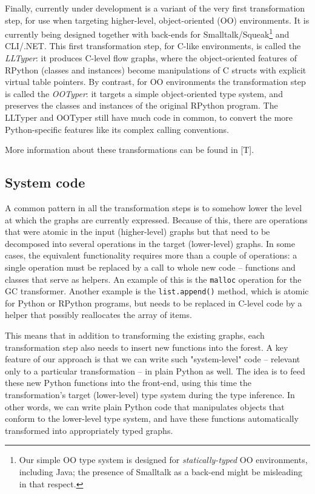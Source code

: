 \documentclass{acm_proc_article-sp}
\begin{document}
Finally, currently under development is a variant of the very first
transformation step, for use when targeting higher-level,
object-oriented (OO) environments.  It is currently being designed
together with back-ends for Smalltalk/Squeak\footnote{Our simple OO
type system is designed for \textit{statically-typed} OO environments,
including Java; the presence of Smalltalk as a back-end might be
misleading in that respect.} and CLI/.NET.  This first transformation
step, for C-like environments, is called the \textit{LLTyper}: it produces
C-level flow graphs, where the object-oriented features of RPython
(classes and instances) become manipulations of C structs with
explicit virtual table pointers.  By contrast, for OO environments the
transformation step is called the \textit{OOTyper}: it targets a simple
object-oriented type system, and preserves the classes and instances
of the original RPython program.  The LLTyper and OOTyper still have
much code in common, to convert the more Python-specific features like
its complex calling conventions.

More information about these transformations can be found in [T].


\subsection{System code}

A common pattern in all the transformation steps is to somehow lower the
level at which the graphs are currently expressed.  Because of this,
there are operations that were atomic in the input (higher-level) graphs
but that need to be decomposed into several operations in the target
(lower-level) graphs.  In some cases, the equivalent functionality
requires more than a couple of operations: a single operation must be
replaced by a call to whole new code -- functions and classes that serve
as helpers.  An example of this is the \texttt{malloc} operation for the GC
transformer.  Another example is the \texttt{list.append()} method, which is
atomic for Python or RPython programs, but needs to be replaced in
C-level code by a helper that possibly reallocates the array of items.

This means that in addition to transforming the existing graphs, each
transformation step also needs to insert new functions into the forest.
A key feature of our approach is that we can write such "system-level"
code -- relevant only to a particular transformation -- in plain Python
as well.  The idea is to feed these new Python functions into the
front-end, using this time the transformation's target (lower-level)
type system during the type inference.  In other words, we can write
plain Python code that manipulates objects that conform to the
lower-level type system, and have these functions automatically
transformed into appropriately typed graphs.
\end{document}
